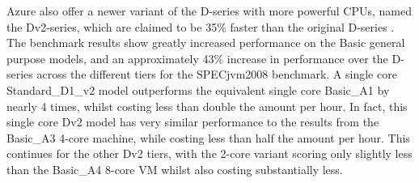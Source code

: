 \documentclass[conference]{IEEEtran}
\begin{document}
\begin{table*}[!h]
\begin{adjustbox}{width=\linewidth,center}
  \end{adjustbox}
\end{table*}

Azure also offer a newer variant of the D-series with more powerful CPUs, named the Dv2-series, which are claimed to be 35\% faster than the original D-series \cite{azurevmtype}. The benchmark results show greatly increased performance on the Basic general purpose models, and an approximately 43\% increase in performance over the D-series across the different tiers for the SPECjvm2008 benchmark. A single core Standard\_D1\_v2 model outperforms the equivalent single core Basic\_A1 by nearly 4 times, whilst costing less than double the amount per hour. In fact, this single core Dv2 model has very similar performance to the results from the Basic\_A3 4-core machine, while costing less than half the amount per hour. This continues for the other Dv2 tiers, with the 2-core variant scoring only slightly less than the Basic\_A4 8-core VM whilst also costing substantially less.
\end{document}

